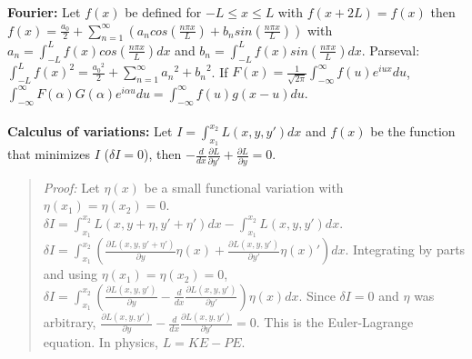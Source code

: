 {\bf Fourier:} Let $f(x)$ be defined for $-L \leq x \leq L$ with $f(x+2L)=f(x)$ then
$f(x)= {\frac {a_0} 2} + \sum_{n=1}^{\infty} (a_n cos({\frac {n \pi x} L}) +
b_n sin({\frac {n \pi x} L} ))$ with
$a_n= \int_{-L}^L f(x) cos({\frac {n \pi x} L}) dx$ and
$b_n= \int_{-L}^L f(x) sin({\frac {n \pi x} L}) dx$.  Parseval: 
$\int_{-L}^L f(x)^2= {\frac {{a_0}^2} 2} + \sum_{n=1}^{\infty} {a_n}^2 + {b_n}^2$. If
$F(x)= {\frac 1 {\sqrt {2 \pi}}} \int_{-\infty}^{\infty} f(u) e^{i u x} du$,
$\int_{-\infty}^{\infty} F(\alpha) G(\alpha) e^{i \alpha u} du=
\int_{-\infty}^{\infty} f(u) g(x-u) du $.
\\
\\
{\bf Calculus of variations:}  Let $I= \int_{x_1}^{x_2} L(x, y, y') dx$ and $f(x)$ be the
function that minimizes $I$ ($\delta I = 0$), then
$ -{\frac {d} {dx}} {\frac {\partial L} {\partial y'}} +
{\frac {\partial L} {\partial y}}= 0 $.
\begin{quote}
\emph{Proof:}
Let $\eta(x)$ be a small functional variation with $\eta(x_1)=\eta(x_2)=0$.
$\delta I= \int_{x_1}^{x_2} L(x, y+ \eta, y' + \eta') dx -
\int_{x_1}^{x_2} L(x, y, y') dx$.
$\delta I= \int_{x_1}^{x_2} ({\frac {\partial L(x, y, y' + \eta')}{\partial y}} \eta(x)+
{\frac {\partial L(x, y, y')}{\partial y'}} \eta(x)') dx$.  Integrating by parts and using
$\eta(x_1)=\eta(x_2)=0$,
$\delta I= \int_{x_1}^{x_2} 
({\frac {\partial L(x, y, y')}{\partial y}} -
{\frac {d} {dx}}{\frac {\partial L(x, y, y')}{\partial y'}}) \eta(x)
dx$.   Since $\delta I= 0$ and $\eta$ was arbitrary,
${\frac {\partial L(x, y, y')}{\partial y}} -
{\frac {d} {dx}}{\frac {\partial L(x, y, y')}{\partial y'}} = 0$.  This is the 
Euler-Lagrange equation.  In physics, $L= KE-PE$.
\end{quote}
